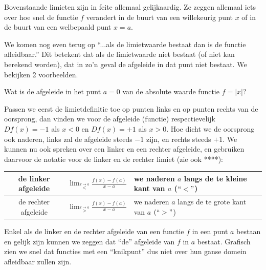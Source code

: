 Bovenstaande limieten zijn in feite allemaal gelijkaardig. Ze zeggen
allemaal iets over hoe snel de functie $f$ verandert in de buurt
van een willekeurig punt $x$ of in de buurt van een welbepaald punt
$x=a$.

\medskip{}


We komen nog even terug op ``...als de limietwaarde bestaat dan is
de functie afleidbaar.'' Dit betekent dat als de limietwaarde niet
bestaat (of niet kan berekend worden), dat in zo'n geval de afgeleide
in dat punt niet bestaat. We bekijken 2 voorbeelden.\medskip{}


\begin{voorbeeld}
	Wat is de afgeleide in het punt $a=0$ van de absolute
waarde functie $f=\left|x\right|$? 

	\begin{center}
		
	\end{center}


Passen we eerst de limietdefinitie
toe op punten links en op punten rechts van de oorsprong, dan vinden
we voor de afgeleide (functie) respectievelijk $Df(x)=-1$ als $x<0$
en $Df(x)=+1$ als $x>0$. Hoe dicht we de oorsprong ook naderen,
links zal de afgeleide steeds $-1$ zijn, en rechts steeds $+1$.
We kunnen nu ook spreken over een linker en een rechter afgeleide,
en gebruiken daarvoor de notatie voor de linker en de rechter limiet
(zie ook {*}{*}{*}{*}):\medskip{}
\end{voorbeeld}


\begin{tabular}{|c|c|l|}
	\hline 
	\multirow{1}{*}{de linker afgeleide} & ${\displaystyle \lim_{\overset{x\rightarrow a}{<}}}\frac{f(x)-f(a)}{x-a}$ & we naderen $a$ langs de te kleine kant van $a$ ($\lyxmathsym{\textquotedblleft}<\lyxmathsym{\textquotedblright}$)\tabularnewline
	\hline 
	\multirow{1}{*}{de rechter afgeleide} & ${\displaystyle \lim_{\overset{x\rightarrow a}{>}}}\frac{f(x)-f(a)}{x-a}$ & we naderen $a$ langs de te grote kant van $a$ $(\lyxmathsym{\textquotedblleft}>\lyxmathsym{\textquotedblright}$)\tabularnewline
	\hline 
\end{tabular}

\medskip{}


Enkel als de linker en de rechter afgeleide van een functie $f$ in
een punt $a$ bestaan en gelijk zijn kunnen we zeggen dat ``de''
afgeleide van $f$ in $a$ bestaat. Grafisch zien we snel dat functies
met een ``knikpunt'' dus niet over hun ganse domein afleidbaar zullen
zijn.\medskip{}


